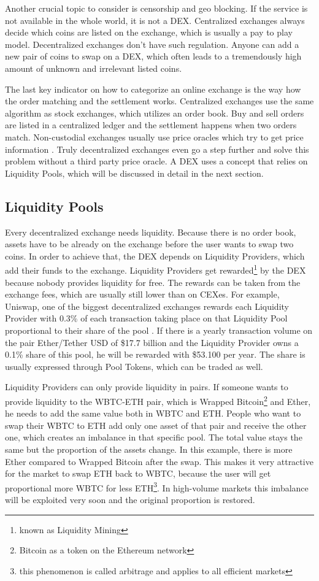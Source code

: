 Another crucial topic to consider is censorship and geo blocking. If the service is not available in the whole world, it is not a DEX. Centralized exchanges always decide which coins are listed on the exchange, which is usually a pay to play model. Decentralized exchanges don't have such regulation. Anyone can add a new pair of coins to swap on a DEX, which often leads to a tremendously high amount of unknown and irrelevant listed coins.

The last key indicator on how to categorize an online exchange is the way how the order matching and the settlement works. Centralized exchanges use the same algorithm as stock exchanges, which utilizes an order book. Buy and sell orders are listed in a centralized ledger and the settlement happens when two orders match. Non-custodial exchanges usually use price oracles which try to get price information \cite[p.\ 47]{WuSun2018}. Truly decentralized exchanges even go a step further and solve this problem without a third party price oracle. A DEX uses a concept that relies on Liquidity Pools, which will be discussed in detail in the next section.

\subsection{Liquidity Pools}
\label{subsec:liquiditypools}
Every decentralized exchange needs liquidity. Because there is no order book, assets have to be already on the exchange before the user wants to swap two coins. In order to achieve that, the DEX depends on Liquidity Providers, which add their funds to the exchange. Liquidity Providers get rewarded\footnote{known as Liquidity Mining} by the DEX because nobody provides liquidity for free. The rewards can be taken from the exchange fees, which are usually still lower than on CEXes. For example, Uniswap, one of the biggest decentralized exchanges rewards each Liquidity Provider with 0.3\% of each transaction taking place on that Liquidity Pool proportional to their share of the pool \cite{Uniswap2020}. If there is a yearly transaction volume on the pair Ether/Tether USD of \$17.7 billion and the Liquidity Provider owns a 0.1\% share of this pool, he will be rewarded with \$53.100 per year. The share is usually expressed through Pool Tokens, which can be traded as well.

Liquidity Providers can only provide liquidity in pairs. If someone wants to provide liquidity to the WBTC-ETH pair, which is Wrapped Bitcoin\footnote{Bitcoin as a token on the Ethereum network} and Ether, he needs to add the same value both in WBTC and ETH. People who want to swap their WBTC to ETH add only one asset of that pair and receive the other one, which creates an imbalance in that specific pool. The total value stays the same but the proportion of the assets change. In this example, there is more Ether compared to Wrapped Bitcoin after the swap. This makes it very attractive for the market to swap ETH back to WBTC, because the user will get proportional more WBTC for less ETH\footnote{this phenomenon is called arbitrage and applies to all efficient markets}. In high-volume markets this imbalance will be exploited very soon and the original proportion is restored.

